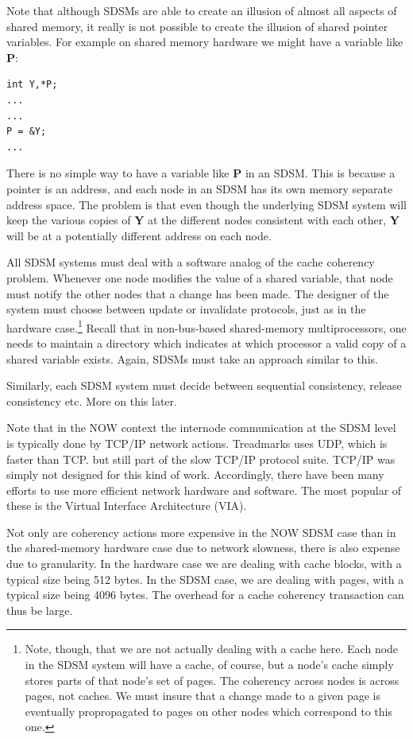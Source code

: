 Note that although SDSMs are able to create an illusion of almost all 
aspects of shared memory, it really is not possible to create the
illusion of shared pointer variables.  For example on shared memory
hardware we might have a variable like {\bf P}:

\begin{Verbatim}[fontsize=\relsize{-2}]
int Y,*P;
...
...
P = &Y;
...
\end{Verbatim}

There is no simple way to have a variable like {\bf P} in an SDSM.
This is because a pointer is an address, and each node in an SDSM
has its own memory separate address space.  The problem is that even
though the underlying SDSM system will keep the various copies of {\bf Y} 
at the different nodes consistent with each other, {\bf Y} will be at a
potentially different address on each node.

All SDSM systems must deal with a software analog of the cache coherency
problem.  Whenever one node modifies the value of a shared variable,
that node must notify the other nodes that a change has been made.  The
designer of the system must choose between update or invalidate
protocols, just as in the hardware case.\footnote{Note, though, that we
are not actually dealing with a cache here.  Each node in the SDSM
system will have a cache, of course, but a node's cache simply stores
parts of that node's set of pages.  The coherency across nodes is across
pages, not caches.  We must insure that a change made to a given page is
eventually propropagated to pages on other nodes which correspond to
this one.} Recall that in non-bus-based shared-memory multiprocessors,
one needs to maintain a directory which indicates at which processor a
valid copy of a shared variable exists.  Again, SDSMs must take an
approach similar to this.

Similarly, each SDSM system must decide between sequential
consistency, release consistency etc.  More on this later.

Note that in the NOW context the internode communication at the SDSM
level is typically done by TCP/IP network actions.  Treadmarks uses UDP,
which is faster than TCP. but still part of the slow TCP/IP protocol
suite.  TCP/IP was simply not designed for this kind of work.
Accordingly, there have been many efforts to use more efficient network
hardware and software.  The most popular of these is the Virtual
Interface Architecture (VIA).  

Not only are coherency actions more expensive in the NOW SDSM case than in
the shared-memory hardware case due to network slowness, there is also
expense due to granularity.  In the hardware case we are dealing with
cache blocks, with a typical size being 512 bytes.  In the SDSM case, we
are dealing with pages, with a typical size being 4096 bytes.  The
overhead for a cache coherency transaction can thus be large.

